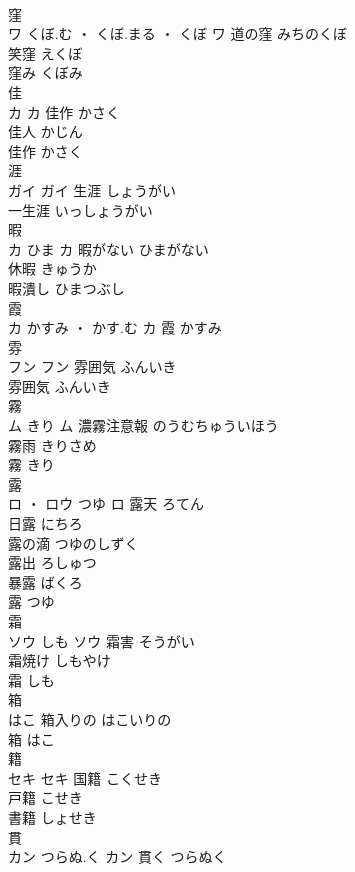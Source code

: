 \documentclass[8pt]{extreport}
\begin{document}
\begin{CJK}{UTF8}{min}
\\	窪	
\\	ワ	くぼ.む ・ くぼ.まる ・ くぼ	ワ	道の窪	みちのくぼ	
\\	笑窪	えくぼ	
\\	窪み	くぼみ	
\\	佳	
\\	カ		カ	佳作	かさく	
\\	佳人	かじん	
\\	佳作	かさく	
\\	涯	
\\	ガイ		ガイ	生涯	しょうがい	
\\	一生涯	いっしょうがい	
\\	暇	
\\	カ	ひま	カ	暇がない	ひまがない	
\\	休暇	きゅうか	
\\	暇潰し	ひまつぶし	
\\	霞	
\\	カ	かすみ ・ かす.む	カ													霞	かすみ	
\\	雰	
\\	フン		フン	雰囲気	ふんいき	
\\	雰囲気	ふんいき	
\\	霧	
\\	ム	きり	ム	濃霧注意報	のうむちゅういほう	
\\	霧雨	きりさめ	
\\	霧	きり	
\\	露	
\\	ロ ・ ロウ	つゆ	ロ	露天	ろてん	
\\	日露	にちろ	
\\	露の滴	つゆのしずく	
\\	露出	ろしゅつ	
\\	暴露	ばくろ	
\\	露	つゆ	
\\	霜	
\\	ソウ	しも	ソウ	霜害	そうがい	
\\	霜焼け	しもやけ	
\\	霜	しも	
\\	箱	
\\	はこ		箱入りの	はこいりの	
\\	箱	はこ	
\\	籍	
\\	セキ		セキ	国籍	こくせき	
\\	戸籍	こせき	
\\	書籍	しょせき	
\\	貫	
\\	カン	つらぬ.く	カン	貫く	つらぬく	

\end{CJK}
\end{document}
